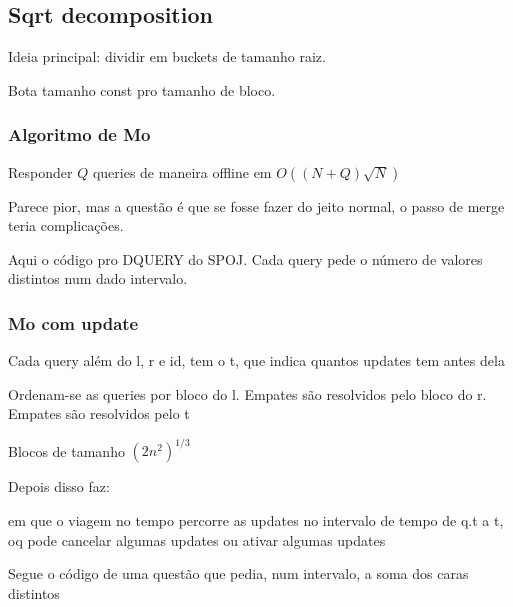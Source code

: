 \subsection{Sqrt decomposition}

Ideia principal: dividir em buckets de tamanho raiz.

Bota tamanho const pro tamanho de bloco.

\subsubsection{Algoritmo de Mo}

Responder $Q$ queries de maneira offline em $O((N+Q) \sqrt{N})$

Parece pior, mas a questão é que se fosse fazer do jeito normal, o passo
de merge teria complicações.

Aqui o código pro DQUERY do SPOJ. Cada query pede o número de valores distintos
num dado intervalo.


\subsubsection{Mo com update}

Cada query além do l, r e id, tem o t, que indica quantos updates tem antes dela

Ordenam-se as queries por bloco do l. Empates são resolvidos pelo bloco do r.
Empates são resolvidos pelo t

Blocos de tamanho  $(2n^2)^{1/3}$

Depois disso faz:


em que o viagem no tempo percorre as updates no intervalo 
de tempo de q.t a t, oq pode cancelar algumas updates ou ativar algumas updates

Segue o código de uma questão que pedia, num intervalo, a soma dos caras distintos

